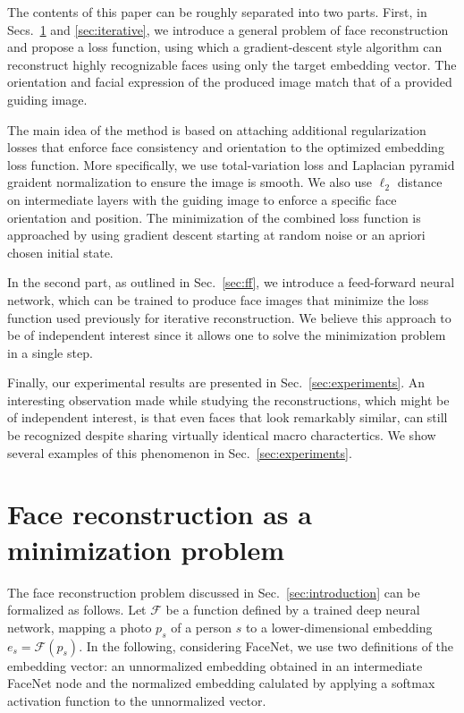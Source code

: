 \documentclass{article}
\def\F{\mc{F}}
\def\Img{p}
\def\Emb{e}
\def\Pers{s}
\def\NetF{\mc{F}}
\newcommand{\mc}[1]{\mathcal{#1}}
\newcommand{\Sec}[1]{Sec.~\ref{#1}}
\newcommand{\Secs}[1]{Secs.~\ref{#1}}
\newcommand{\omtnips}[1]{#1}
\begin{document}
  The contents of this paper can be roughly separated into two parts.
  First, in \Secs{sec:minimization} and \ref{sec:iterative}, we introduce a general problem of face reconstruction and propose a loss function, using which a gradient-descent style algorithm can reconstruct highly recognizable faces using only the target embedding vector.
  The orientation and facial expression of the produced image match that of a provided guiding image.
  \omtnips{
  The main idea of the method is based on attaching additional regularization losses that enforce face consistency and orientation to the optimized embedding loss function.
  More specifically, we use total-variation loss \cite{mahendran:15} and Laplacian pyramid graident normalization \cite{burt:83}
  to ensure the image is smooth.
  We also use $\ell_2$ distance on intermediate layers with the guiding image to enforce a specific face orientation and position.
  The minimization of the combined loss function is approached by using gradient descent starting at random noise or an apriori chosen initial state.
  }

  In the second part, as outlined in \Sec{sec:ff}, we introduce a feed-forward neural network, which can be trained to produce face images that minimize the loss function used previously for iterative reconstruction.
  We believe this approach to be of independent interest since it allows one to solve the minimization problem in a single step.

  Finally, our experimental results are presented in \Sec{sec:experiments}.
  An interesting observation made while studying the reconstructions, which might be of independent interest, is that
  even faces that look remarkably similar, can still be recognized despite sharing virtually identical macro charactertics.
  We show several examples of this phenomenon in \Sec{sec:experiments}.

\section{Face reconstruction as a minimization problem}
\label{sec:minimization}

  The face reconstruction problem discussed in \Sec{sec:introduction} can be formalized as follows.
  Let $\NetF$ be a function defined by a trained deep neural network, mapping a photo $\Img_\Pers$ of a person $\Pers$ to a lower-dimensional embedding $\Emb_\Pers = \F(\Img_\Pers)$.
  In the following, considering FaceNet, we use two definitions of the embedding vector: an unnormalized embedding obtained in an intermediate FaceNet node and the normalized embedding calulated by applying a softmax activation function to the unnormalized vector.
\end{document}
